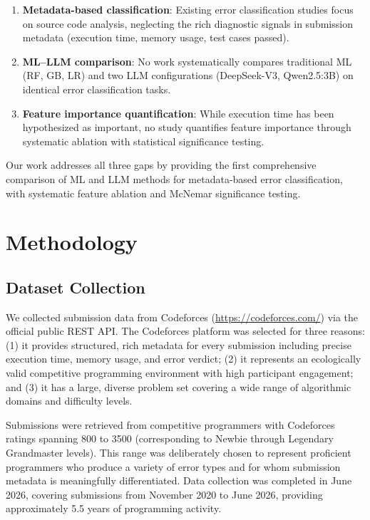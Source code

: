 \documentclass[acmsmall]{acmart}
\begin{document}
\begin{enumerate}
    \item \textbf{Metadata-based classification}: Existing error classification
          studies focus on source code analysis, neglecting the rich diagnostic
          signals in submission metadata (execution time, memory usage, test cases
          passed).
    \item \textbf{ML--LLM comparison}: No work systematically compares traditional
          ML (RF, GB, LR) and two LLM configurations (DeepSeek-V3, Qwen2.5:3B)
          on identical error classification tasks.
    \item \textbf{Feature importance quantification}: While execution time has been
          hypothesized as important, no study quantifies feature importance through
          systematic ablation with statistical significance testing.
\end{enumerate}

Our work addresses all three gaps by providing the first comprehensive comparison
of ML and LLM methods for metadata-based error classification, with systematic
feature ablation and McNemar significance testing.

\section{Methodology}

\subsection{Dataset Collection}

We collected submission data from Codeforces (\url{https://codeforces.com/})
via the official public REST API. The Codeforces
platform was selected for three reasons: (1) it provides structured, rich
metadata for every submission including precise execution time, memory usage,
and error verdict; (2) it represents an ecologically valid competitive
programming environment with high participant engagement; and (3) it has a
large, diverse problem set covering a wide range of algorithmic domains and
difficulty levels.

Submissions were retrieved from competitive programmers with Codeforces
ratings spanning 800 to 3500 (corresponding to Newbie through Legendary
Grandmaster levels). This range was deliberately chosen to represent
proficient programmers who produce a variety of error types and for whom
submission metadata is meaningfully differentiated. Data collection was
completed in June 2026, covering submissions from November 2020 to June
2026, providing approximately 5.5 years of programming activity.
\end{document}
